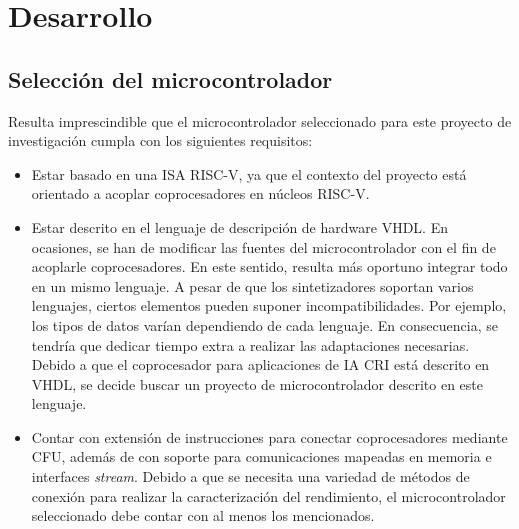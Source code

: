 \chapter{Desarrollo} %

\label{Desarrollo}

\section{Selección del microcontrolador}

\label{Selec}

Resulta imprescindible que el microcontrolador seleccionado para este proyecto de investigación cumpla con los siguientes requisitos:

\begin{itemize}
    \item Estar basado en una ISA RISC-V, ya que el contexto del proyecto está orientado a acoplar coprocesadores en núcleos RISC-V.
    \item Estar descrito en el lenguaje de descripción de hardware VHDL. 
En ocasiones, se han de modificar las fuentes del microcontrolador con el fin de acoplarle coprocesadores.
En este sentido, resulta más oportuno integrar todo en un mismo lenguaje. 
A pesar de que los sintetizadores soportan varios lenguajes, ciertos elementos pueden suponer incompatibilidades.
Por ejemplo, los tipos de datos varían dependiendo de cada lenguaje.
En consecuencia, se tendría que dedicar tiempo extra a realizar las adaptaciones necesarias.
Debido a que el coprocesador para aplicaciones de IA CRI está descrito en VHDL, se decide buscar un proyecto de microcontrolador descrito en este lenguaje.
    \item Contar con extensión de instrucciones para conectar coprocesadores mediante CFU, además de con soporte para comunicaciones mapeadas en memoria e interfaces \textit{stream}. 
Debido a que se necesita una variedad de métodos de conexión para realizar la caracterización del rendimiento, el microcontrolador seleccionado debe contar con al menos los mencionados.
\end{itemize} 

